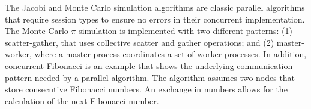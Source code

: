 The Jacobi and Monte Carlo simulation algorithms are classic parallel algorithms
that require session types to ensure no errors in their
concurrent implementation.
The Monte Carlo $\pi$ simulation is implemented with two different patterns:
(1) scatter-gather, that uses collective scatter and gather operations; and
(2) master-worker, where a master process coordinates a set of worker processes.
%
In addition, concurrent Fibonacci is an
example that shows the underlying communication
pattern needed by a parallel algorithm.
The algorithm assumes two nodes that store
consecutive Fibonacci numbers. An exchange
in numbers allows for the calculation of the
next Fibonacci number.





